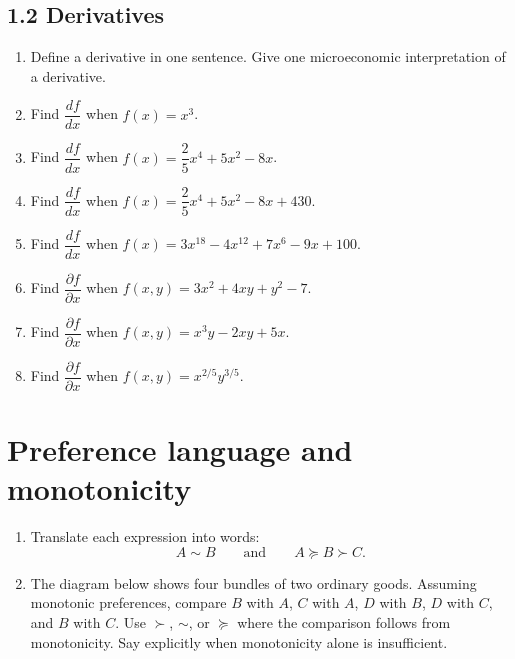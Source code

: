 \documentclass[11pt,a4paper]{article}
\begin{document}
\subsection*{1.2 Derivatives}
\begin{enumerate}[label=(\arabic*),start=6]
  \item Define a derivative in one sentence. Give one microeconomic
  interpretation of a derivative.
  \item Find \(\dfrac{df}{dx}\) when \(f(x)=x^3\).
  \item Find \(\dfrac{df}{dx}\) when
  \(f(x)=\dfrac{2}{5}x^4+5x^2-8x\).
  \item Find \(\dfrac{df}{dx}\) when
  \(f(x)=\dfrac{2}{5}x^4+5x^2-8x+430\).
  \item Find \(\dfrac{df}{dx}\) when
  \(f(x)=3x^{18}-4x^{12}+7x^6-9x+100\).
  \item Find \(\dfrac{\partial f}{\partial x}\) when
  \(f(x,y)=3x^2+4xy+y^2-7\).
  \item Find \(\dfrac{\partial f}{\partial x}\) when
  \(f(x,y)=x^3y-2xy+5x\).
  \item Find \(\dfrac{\partial f}{\partial x}\) when
  \(f(x,y)=x^{2/5}y^{3/5}\).
\end{enumerate}

\section{Preference language and monotonicity}

\begin{enumerate}[label=\textbf{2.\alph*}]
  \item Translate each expression into words:
  \[
    A\sim B
    \qquad\text{and}\qquad
    A\succeq B\succ C.
  \]
  \item The diagram below shows four bundles of two ordinary goods. Assuming
  monotonic preferences, compare \(B\) with \(A\),
  \(C\) with \(A\), \(D\) with \(B\), \(D\) with \(C\), and \(B\) with \(C\).
  Use \(\succ\), \(\sim\), or \(\succeq\) where the comparison follows from
  monotonicity. Say explicitly when monotonicity alone is insufficient.
\end{enumerate}
\end{document}

